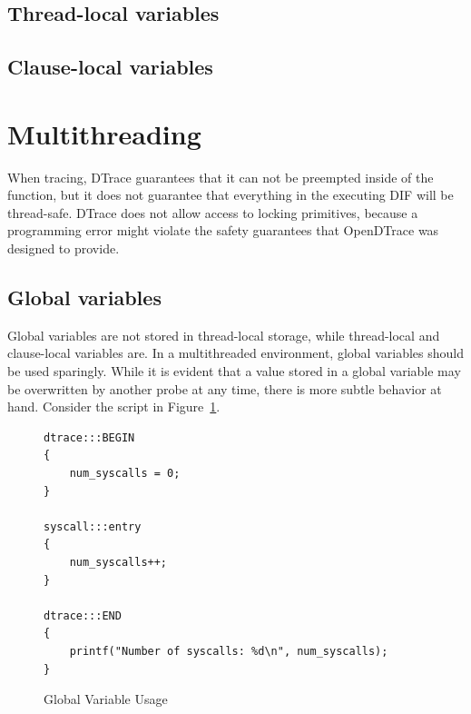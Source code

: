 \subsection{Thread-local variables}
\label{subsec:thread-local-variables}

\subsection{Clause-local variables}
\label{subsec:clause-local-variables}

\section{Multithreading}


When tracing, DTrace guarantees that it can not be preempted inside of
the  function, but it does not guarantee that
everything in the executing DIF will be thread-safe. DTrace does not
allow access to locking primitives, because a programming error might
violate the safety guarantees that OpenDTrace was designed to provide.

\subsection{Global variables}

Global variables are not stored in thread-local storage, while
thread-local and clause-local variables are. In a multithreaded
environment, global variables should be used sparingly. While it is
evident that a value stored in a global variable may be overwritten by
another probe at any time, there is more subtle behavior at
hand. Consider the script in Figure~\ref{fig:global-var-usage}. \newline

\begin{figure}
  \begin{lstlisting}
dtrace:::BEGIN
{
    num_syscalls = 0;
}

syscall:::entry
{
    num_syscalls++;
}
    
dtrace:::END
{
    printf("Number of syscalls: %d\n", num_syscalls);
}
  \end{lstlisting}
  \caption{Global Variable Usage}
  \label{fig:global-var-usage}
\end{figure}


